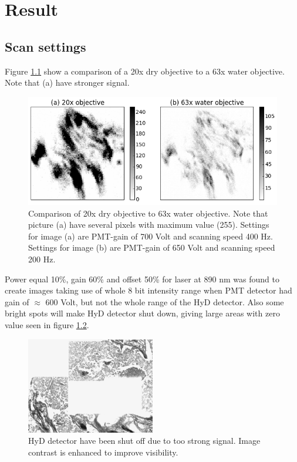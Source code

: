 \chapter{Result}
%
%
\section{Scan settings}
Figure \ref{fig:obj_comparison} show a comparison of a 20x dry objective to a 63x water objective. Note that (a) have stronger signal.

\begin{figure}[h]
\centering
\includegraphics[width=\textwidth]{objectives}
\caption{Comparison of 20x dry objective to 63x water objective. Note that picture (a) have several pixels with maximum value (255). Settings for image (a) are PMT-gain of 700 Volt and scanning speed 400 Hz. Settings for image (b) are PMT-gain of 650 Volt and scanning speed 200 Hz.}
\label{fig:obj_comparison}
\end{figure}

Power equal 10\%, gain 60\% and offset 50\% for laser at 890 nm was found to create images taking use of whole 8 bit intensity range when PMT detector had gain of $\approx$ 600 Volt, but not the whole range of the HyD detector. Also some bright spots will make HyD detector shut down, giving large areas with zero value seen in figure \ref{fig:hyd}.

\begin{figure}
\centering
\includegraphics[width=0.5\textwidth]{hyd}
\caption{HyD detector have been shut off due to too strong signal. Image contrast is enhanced to improve visibility.}
\label{fig:hyd}
\end{figure}
 
